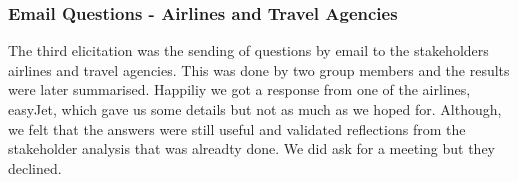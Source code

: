 \subsubsection{Email Questions - Airlines and Travel Agencies}
The third elicitation was the sending of questions by email to the stakeholders airlines and travel agencies. This was done by two group members and the results were later summarised. Happiliy we got a response from one of the airlines, easyJet, which gave us some details but not as much as we hoped for. Although, we felt that the answers were still useful and validated reflections from the stakeholder analysis that was alreadty done. We did ask for a meeting but they declined.